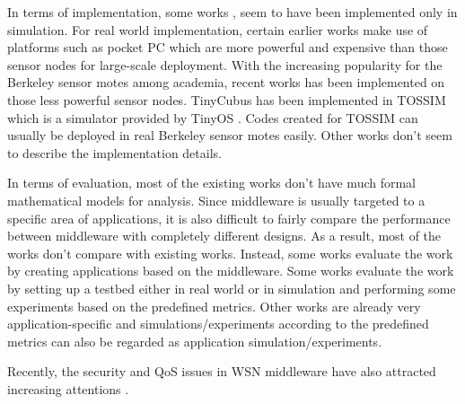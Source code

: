 In terms of implementation, some works \cite{sina, dsware}, seem to have been implemented only in simulation. For real world implementation, certain earlier works \cite{impala, sensorware, smartmessage} make use of platforms such as pocket PC which are more powerful and expensive than those sensor nodes for large-scale deployment. With the increasing popularity for the Berkeley sensor motes \cite{crossbow} among academia, recent works \cite{mate, tinylime, tinydb, envirotrack, agilla} has been implemented on those less powerful sensor nodes. TinyCubus \cite{tinycubus} has been implemented in TOSSIM \cite{tossim} which is a simulator provided by TinyOS \cite{nesc}. Codes created for TOSSIM can usually be deployed in real Berkeley sensor motes easily. Other works don't seem to describe the implementation details.

In terms of evaluation, most of the existing works don't have much formal mathematical models for analysis. Since middleware is usually targeted to a specific area of applications, it is also difficult to fairly compare the performance between middleware with completely different designs. As a result, most of the works don't compare with existing works. Instead, some works \cite{sina, mate, sensorware, smartmessage, agilla} evaluate the work by creating applications based on the middleware. Some works \cite{impala, dsware, clustermiddleware, tinycubus, tinylime}  evaluate the work by setting up a testbed either in real world or in simulation and performing some experiments based on the predefined metrics. Other works \cite{envirotrack, tinydb} are already very application-specific and simulations/experiments according to the predefined metrics can also be regarded as application simulation/experiments.

Recently, the security and QoS issues in WSN middleware have also attracted increasing attentions \cite{milan}.